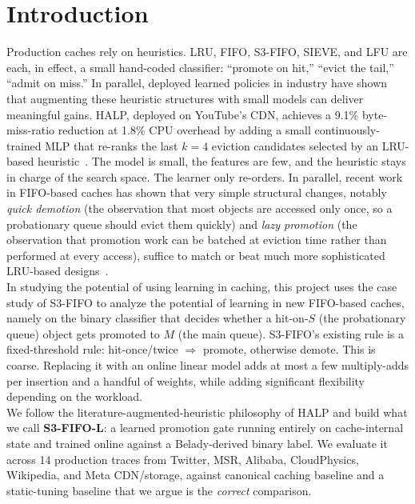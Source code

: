\documentclass[letterpaper,twocolumn,10pt]{article}
\begin{document}
\section{Introduction}
 
Production caches rely on heuristics. LRU, FIFO, S3-FIFO, SIEVE, and
LFU are each, in effect, a small hand-coded classifier: ``promote on
hit,'' ``evict the tail,'' ``admit on miss.'' In parallel, deployed learned policies in industry have shown that
augmenting these heuristic structures with small models can deliver
meaningful gains. HALP, deployed on YouTube's CDN, achieves a
9.1\% byte-miss-ratio reduction at 1.8\% CPU overhead by adding a
small continuously-trained MLP that re-ranks the last $k=4$ eviction
candidates selected by an LRU-based heuristic~\cite{halp}. The model is
small, the features are few, and the heuristic stays in charge of the
search space. The learner only re-orders. 
In parallel, recent work in
FIFO-based caches has shown that very simple structural changes,
notably \emph{quick demotion} (the observation that most objects are
accessed only once, so a probationary queue should evict them
quickly) and \emph{lazy promotion} (the observation that promotion
work can be batched at eviction time rather than performed at every
access), suffice to match or beat much more sophisticated LRU-based
designs~\cite{s3fifo,sieve}. \\
In studying the potential of using learning in caching, this project uses the case study of S3-FIFO to analyze the potential of learning in new FIFO-based caches, namely on the binary classifier that decides
whether a hit-on-$S$ (the probationary queue) object gets promoted to $M$ (the main queue). S3-FIFO's existing
rule is a fixed-threshold rule: hit-once/twice $\Rightarrow$
promote, otherwise demote. This is coarse. Replacing it with an online linear model adds at
most a few multiply-adds per insertion and a handful of weights, while adding significant flexibility depending on the workload. \\
We follow the literature-augmented-heuristic philosophy of HALP and
build what we call \textbf{S3-FIFO-L}: a learned promotion gate
running entirely on cache-internal state and trained online against
a Belady-derived binary label. We evaluate it across 14 production
traces from Twitter, MSR, Alibaba, CloudPhysics, Wikipedia, and
Meta CDN/storage, against canonical caching
baseline and a static-tuning baseline that we argue is
the \emph{correct} comparison.
\end{document}

